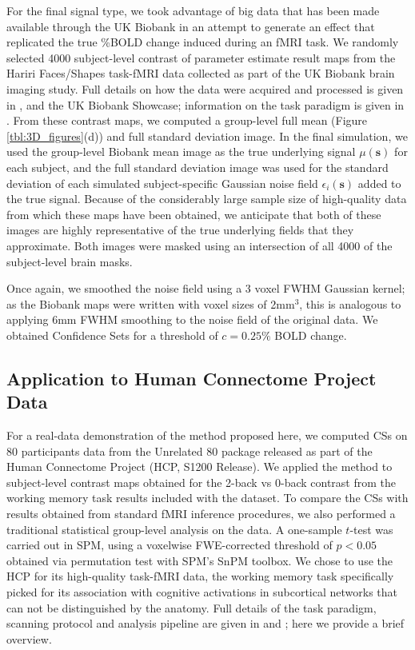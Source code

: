 For the final signal type, we took advantage of big data that has been made available through the UK Biobank in an attempt to generate an effect that replicated the true \%BOLD change induced during an fMRI task. We randomly selected 4000 subject-level contrast of parameter estimate result maps from the Hariri Faces/Shapes task-fMRI data collected as part of the UK Biobank brain imaging study. Full details on how the data were acquired and processed is given in \citet{Miller2016-hd}, \citet{Alfaro-Almagro2018-ip} and the UK Biobank Showcase; information on the task paradigm is given in \citet{Hariri2002-ns}. From these contrast maps, we computed a group-level full mean (Figure \ref{tbl:3D_figures}(d)) and full standard deviation image. In the final simulation, we used the group-level Biobank mean image as the true underlying signal $\mu(\bm{s})$ for each subject, and the full standard deviation image was used for the standard deviation of each simulated subject-specific Gaussian noise field $\epsilon_{i}(\bm{s})$ added to the true signal. Because of the considerably large sample size of high-quality data from which these maps have been obtained, we anticipate that both of these images are highly representative of the true underlying fields that they approximate. Both images were masked using an intersection of all 4000 of the subject-level brain masks. 

Once again, we smoothed the noise field using a 3 voxel FWHM Gaussian kernel; as the Biobank maps were written with voxel sizes of 2mm$^{3}$, this is analogous to applying 6mm FWHM smoothing to the noise field of the original data. We obtained Confidence Sets for a threshold of $c = 0.25\%$ BOLD change. 


\subsection{Application to Human Connectome Project Data}
\label{sec:HCP_methods}

For a real-data demonstration of the method proposed here, we computed CSs on 80 participants data from the Unrelated 80 package released as part of the Human Connectome Project (HCP, S1200 Release). We applied the method to subject-level contrast maps obtained for the 2-back vs 0-back contrast from the working memory task results included with the dataset. To compare the CSs with results obtained from standard fMRI inference procedures, we also performed a traditional statistical group-level analysis on the data. A one-sample $t$-test was carried out in SPM, using a voxelwise FWE-corrected threshold of $p < 0.05$ obtained via permutation test with SPM's SnPM toolbox. We chose to use the HCP for its high-quality task-fMRI data, the working memory task specifically picked for its association with cognitive activations in subcortical networks that can not be distinguished by the anatomy. Full details of the task paradigm, scanning protocol and analysis pipeline are given in \citet{Barch2013-kk} and \citet{Glasser2013-qc}; here we provide a brief overview. 

